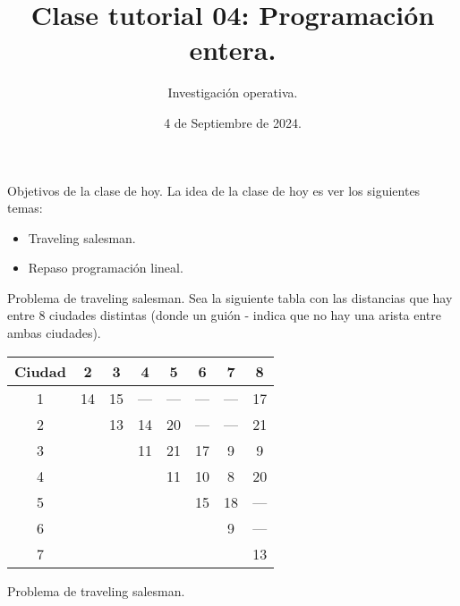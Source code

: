 \documentclass{beamer}
\title[]{Clase tutorial 04: Programación entera.}
\date{4 de Septiembre de 2024.}
\author[]{ Investigación operativa.
  }
\institute{Universidad de San Andrés}
\begin{document}
\maketitle

\begin{frame}{Objetivos de la clase de hoy.}
  La idea de la clase de hoy es ver los siguientes temas:
  \begin{itemize}
    \item Traveling salesman.
    \item Repaso programación lineal.
  \end{itemize}
\end{frame}

\begin{frame}[fragile]{Problema de traveling salesman.}
  Sea la siguiente tabla con las distancias que hay entre 8 ciudades distintas (donde un guión - indica que no hay una arista entre ambas ciudades).

  \begin{center}
    \begin{adjustbox}{width = 0.9 \textwidth}
        \begin{tabular}{|c |c | c | c| c| c| c | c |}
          \hline
          Ciudad & 2 & 3 & 4 & 5 & 6 & 7 & 8 \\
          \hline 
          1 & 14 & 15 & — & — & — & — & 17 \\ 
          2 &  & 13 & 14 & 20 & — & — & 21 \\
          3 & & & 11  & 21 &  17 & 9  & 9 \\
          4 & & & & 11  & 10 & 8 & 20 \\
          5 & & & & &  15 &  18  & — \\
          6 & & & & & & 9 & — \\
          7 & & & & & & & 13 \\
          \hline
        \end{tabular}
    \end{adjustbox}
  \end{center}
\end{frame}

\begin{frame}[fragile]{Problema de traveling salesman.}
\end{frame}
\end{document}
